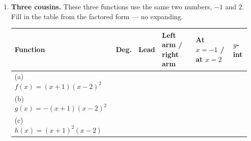 \documentclass[10pt]{article}
\begin{document}
\begin{tcolorbox}[colback=white, colframe=black!40, title=\textbf{Tier R --- Remediate},
    fonttitle=\bfseries, arc=1.5mm, left=3mm, right=3mm, top=2mm, bottom=2mm, breakable]
\begin{enumerate}[leftmargin=1.7em, itemsep=9pt]
  \item \textbf{Three cousins.} These three functions use the same two numbers, $-1$ and $2$. Fill in
    the table from the factored form --- no expanding.

    \vspace{3pt}
    \renewcommand{\arraystretch}{1.5}
    \begin{tabularx}{\linewidth}{|X|C{1.2cm}|C{1.4cm}|C{2.6cm}|C{2.6cm}|C{1.6cm}|}
    \hline
    \textbf{Function} & \textbf{Deg.} & \textbf{Lead} & \textbf{Left arm / right arm} & \textbf{At $x=-1$ / at $x=2$} & \textbf{$y$-int} \\ \hline
    (a) $f(x)=(x+1)(x-2)^2$  &  &   &  &  &  \\ \hline
    (b) $g(x)=-(x+1)(x-2)^2$ &  &  &  &  &  \\ \hline
    (c) $h(x)=(x+1)^2(x-2)$  &  &   &  &  &  \\ \hline
    \end{tabularx}


\end{enumerate}
\end{tcolorbox}
\end{document}
